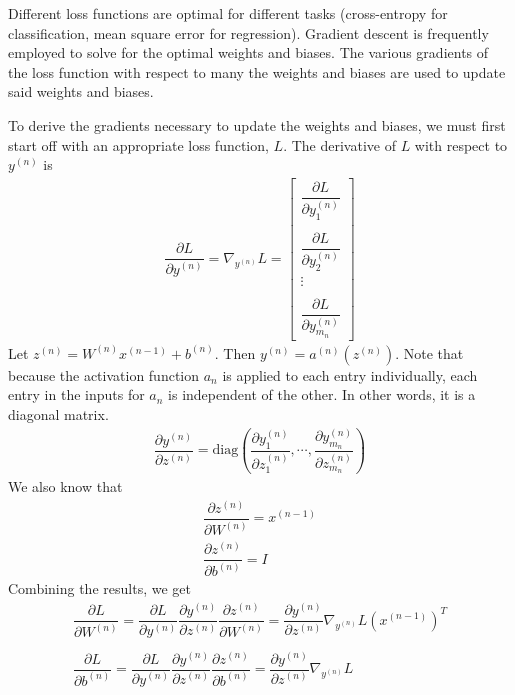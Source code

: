 \documentclass{article}
\begin{document}
	Different loss functions are optimal for different tasks (cross-entropy for classification, mean square error for regression). Gradient descent is frequently employed to solve for the optimal weights and biases. The various gradients of the loss function with respect to many the weights and biases are used to update said weights and biases.
	
	To derive the gradients necessary to update the weights and biases, we must first start off with an appropriate loss function, \( L \). The derivative of \( L \) with respect to \( y^{(n)} \) is
	\begin{gather*}
		\dfrac{\partial L}{\partial y^{(n)}} = \nabla_{y^{(n)}}L 
		=
		\begin{bmatrix}
			\dfrac{\partial L}{\partial y^{(n)}_1} \\ \\
			\dfrac{\partial L}{\partial y^{(n)}_2} \\
			\vdots \\ \\
			\dfrac{\partial L}{\partial y^{(n)}_{m_n}}
		\end{bmatrix}
	\end{gather*}
	Let \(z^{(n)} = W^{(n)} x^{(n-1)} + b^{(n)} \). Then \( y^{(n)} = a^{(n)}(z^{(n)}) \). Note that because the activation function \( a_n \) is applied to each entry individually, each entry in the inputs for \( a_n \) is independent of the other. In other words, it is a diagonal matrix.
	\begin{gather*}
		\dfrac{\partial y^{(n)}}{\partial z^{(n)}} = \text{diag} \left( \dfrac{\partial y^{(n)}_1}{\partial z^{(n)}_1}, \cdots, \dfrac{\partial y^{(n)}_{m_n}}{\partial z^{(n)}_{m_n}}  \right)
	\end{gather*}
	We also know that
	\begin{gather*}
		\dfrac{\partial z^{(n)}}{\partial W^{(n)}} = x^{(n - 1)} \\
		\dfrac{\partial z^{(n)}}{\partial b^{(n)}} = I
	\end{gather*}
	Combining the results, we get
	\begin{gather*}
		\dfrac{\partial L}{\partial W^{(n)}} = \dfrac{\partial L}{\partial y^{(n)}} \dfrac{\partial y^{(n)}}{\partial z^{(n)}} \dfrac{\partial z^{(n)}}{\partial W^{(n)}} = 
		\dfrac{\partial y^{(n)}}{\partial z^{(n)}} \nabla_{y^{(n)}}L  \left( x^{(n - 1)} \right)^T  \\ \\
		\dfrac{\partial L}{\partial b^{(n)}} = \dfrac{\partial L}{\partial y^{(n)}} \dfrac{\partial y^{(n)}}{\partial z^{(n)}} \dfrac{\partial z^{(n)}}{\partial b^{(n)}} = \dfrac{\partial y^{(n)}}{\partial z^{(n)}} \nabla_{y^{(n)}}L
	\end{gather*}
	
\end{document}
